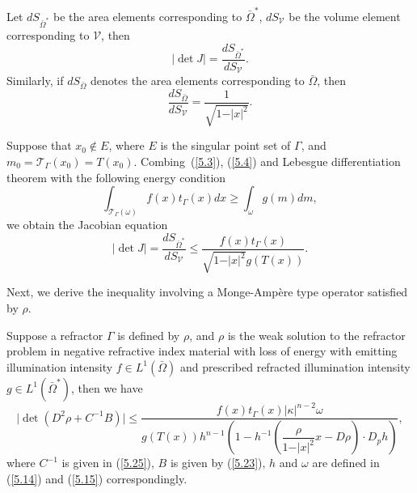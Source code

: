 \documentclass[a4paper,12pt,]{article}
\newtheorem{theorem}{\hskip\parindent\bf Theorem}[section]%
\numberwithin{equation}{section}
\numberwithin{equation}{section} \allowdisplaybreaks
\begin{document}
Let $dS_{\bar{\Omega}^{\ast}}$ be the area elements corresponding to $\bar{\Omega}^{\ast}$, $dS_{\mathcal{V}}$ be the volume element corresponding to $\mathcal{V}$, then
\begin{equation}\label{5.3}
  \vert \det J \vert = \frac{dS_{\bar{\Omega}^{\ast}}}{dS_{\mathcal{V}}}.
\end{equation}
Similarly, if $dS_{\bar{\Omega}}$ denotes the area elements corresponding to $\bar{\Omega}$, then
\begin{equation}\label{5.4}
  \frac{dS_{\bar{\Omega}}}{dS_{\mathcal{V}}} = \frac{1}{\sqrt{1 - \vert x \vert^{2}}}.
\end{equation}

Suppose that $x_{0} \notin E$, where $E$ is the singular point set of $\Gamma$, and $m_{0} = \mathcal{T}_{\Gamma}(x_{0}) = T(x_{0})$. 
Combing~(\ref{5.3}), (\ref{5.4}) and Lebesgue differentiation theorem with the following energy condition
$$\int_{\mathcal{T}_{\Gamma}(\omega)}f(x)t_{\Gamma}(x)dx \geq \int_{\omega}g(m)dm,$$
we obtain the Jacobian equation
\begin{equation}\label{5.5}
   \vert \det J \vert = \frac{dS_{\bar{\Omega}^{\ast}}}{dS_{\mathcal{V}}} \leq \frac{f(x)t_{\Gamma}(x)}{\sqrt{1 - \vert x \vert^{2}}g(T(x))}.
\end{equation}

Next, we derive the inequality involving a Monge-Amp\`ere type operator satisfied by $\rho$.

\begin{theorem}
  Suppose a refractor $\Gamma$ is defined by $\rho$, and $\rho$ is the weak solution to the refractor problem in negative refractive index material with loss of energy with emitting illumination intensity $f \in L^{1}(\bar{\Omega})$ and prescribed refracted illumination intensity $g \in L^{1}(\bar{\Omega}^{\ast})$, then we have
  \begin{equation}\label{5.6}
    \vert \det (D^{2}\rho + C^{-1}B) \vert \leq \frac{f(x)t_{\Gamma}(x)\vert \kappa \vert^{n - 2} \omega}{g(T(x))h^{n - 1}\left(1 - h^{-1}\left(\dfrac{\rho}{1 - \vert x \vert^{2}}x - D\rho\right)\cdot D_{p}h\right)},
  \end{equation}
  where $C^{-1}$ is given in (\ref{5.25}), $B$ is given by (\ref{5.23}), $h$ and $\omega$ are defined in (\ref{5.14}) and (\ref{5.15}) correspondingly.
  \label{thm5.1}
\end{theorem}
\end{document}
